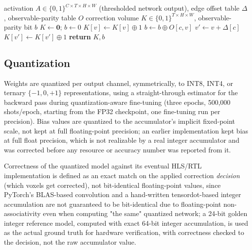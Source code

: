 \documentclass[pdflatex,sn-basic]{sn-jnl}
\begin{document}
\begin{algorithm}
\caption{Per-local-edge correction application}
\label{alg:edge-correction}
\begin{algorithmic}[1]
\Require activation $A \in \{0,1\}^{C \times T \times H \times W}$ (thresholded network output), edge offset table $\Delta$, observable-parity table $O$
\Ensure correction volume $K \in \{0,1\}^{T\times H\times W}$, observable-parity bit $b$
\State $K \gets \mathbf{0}$; $b \gets 0$
  \State $K[v] \gets K[v] \oplus 1$ 
  \State $b \gets b \oplus O[c,v]$ \label{line:obsparity} 
   
    \State $v' \gets v + \Delta[c]$
      \State $K[v'] \gets K[v'] \oplus 1$ 
    \EndIf
  \EndIf
\EndFor
\State \textbf{return} $K, b$
\end{algorithmic}
\end{algorithm}

\subsection{Quantization}\label{subsec:arch-quant}

Weights are quantized per output channel, symmetrically, to INT8, INT4, or ternary \(\{-1,0,+1\}\) representations, using a straight-through estimator for the backward pass during quantization-aware fine-tuning (three epochs, 500{,}000 shots/epoch, starting from the FP32 checkpoint, one fine-tuning run per precision). Bias values are quantized to the accumulator's implicit fixed-point scale, not kept at full floating-point precision; an earlier implementation kept bias at full float precision, which is not realizable by a real integer accumulator and was corrected before any resource or accuracy number was reported from it.

Correctness of the quantized model against its eventual HLS/RTL implementation is defined as an exact match on the applied correction \emph{decision} (which voxels get corrected), not bit-identical floating-point values, since PyTorch's BLAS-based convolution and a hand-written tensordot-based integer accumulation are not guaranteed to be bit-identical due to floating-point non-associativity even when computing "the same" quantized network; a 24-bit golden integer reference model, computed with exact 64-bit integer accumulation, is used as the actual ground truth for hardware verification, with correctness checked to the decision, not the raw accumulator value.
\end{document}
